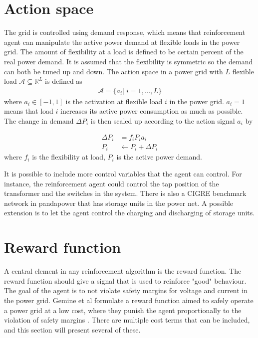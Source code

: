 \documentclass[class=book, crop=false]{standalone}
\begin{document}
\section{Action space}
The grid is controlled using demand response, which means that reinforcement agent can manipulate the active power demand at flexible loads in the power grid. The amount of flexibility at a load is defined to be certain percent of the real power demand. It is assumed that the flexibility is symmetric so the demand can both be tuned up and down. The action space in a power grid with $L$ flexible load  $\mathcal{A}  \subseteq \mathbb{R}^{L}$ is defined as
\begin{equation}
   \begin{aligned}
   \label{eq:problem:action_space}
\mathcal{A}= \{a_{i} | \;i = 1,...,L\}
    \end{aligned} 
\end{equation}
where $a_{i} \in [-1,1]$ is the activation at flexible load $i$ in the power grid. $a_{i} = 1$ means that load $i$ increases its active power consumption as much as possible. The change in demand $\Delta P_{i}$ is then scaled up according to the action signal $a_{i}$ by

\begin{equation}
   \begin{aligned}
   \label{eq:problem:update_demand}
    \Delta P_{i}& = f_{i}P_{i}a_{i} \\
    P_{i}& \leftarrow P_{i} + \Delta P_{i}
    \end{aligned} 
\end{equation}
where $f_{i}$ is the flexibility at load, $P_{i}$ is the active power demand.

It is possible to include more control variables that the agent can control. For instance, the reinforcement agent could control the tap position of the transformer and the switches in the system. There is also a CIGRE benchmark network in pandapower that has storage units in the power net. A possible extension is to let the agent control the charging and discharging of storage units.

\section{Reward function}\label{section:reward}
A central element in any reinforcement algorithm is the reward function. The reward function should give a signal that is used to reinforce "good" behaviour. The goal of the agent is to not violate safety margins for voltage and current in the power grid. Gemine et al formulate a reward function aimed to safely operate a power grid at a low cost, where they punish the agent proportionally to the violation of safety margins \cite{active_network_management}. There are multiple cost terms that can be included, and this section will present several of these. 
\end{document}
